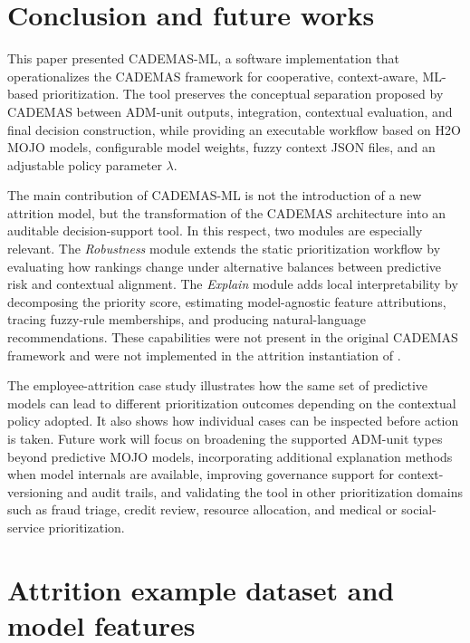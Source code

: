 \documentclass[journal,article,submit,pdftex,moreauthors,mathematics]{Definitions/mdpi}
\begin{document}
\section{Conclusion and future works}\label{sec:conclusions}

This paper presented CADEMAS-ML, a software implementation that operationalizes the CADEMAS framework for cooperative, context-aware, ML-based prioritization. The tool preserves the conceptual separation proposed by CADEMAS between ADM-unit outputs, integration, contextual evaluation, and final decision construction, while providing an executable workflow based on H2O MOJO models, configurable model weights, fuzzy context JSON files, and an adjustable policy parameter $\lambda$.

The main contribution of CADEMAS-ML is not the introduction of a new attrition model, but the transformation of the CADEMAS architecture into an auditable decision-support tool. In this respect, two modules are especially relevant. The \textit{Robustness} module extends the static prioritization workflow by evaluating how rankings change under alternative balances between predictive risk and contextual alignment. The \textit{Explain} module adds local interpretability by decomposing the priority score, estimating model-agnostic feature attributions, tracing fuzzy-rule memberships, and producing natural-language recommendations. These capabilities were not present in the original CADEMAS framework and were not implemented in the attrition instantiation of \citet{Godz2026}.

The employee-attrition case study illustrates how the same set of predictive models can lead to different prioritization outcomes depending on the contextual policy adopted. It also shows how individual cases can be inspected before action is taken. Future work will focus on broadening the supported ADM-unit types beyond predictive MOJO models, incorporating additional explanation methods when model internals are available, improving governance support for context-versioning and audit trails, and validating the tool in other prioritization domains such as fraud triage, credit review, resource allocation, and medical or social-service prioritization.



\newpage
{}
\appendixstart
\appendix
\section{Attrition example dataset and model features}\label{app:attrition_features}
\end{document}
